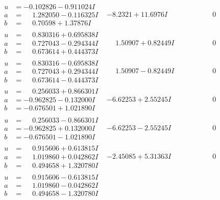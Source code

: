 \documentclass[1p]{elsarticle_modified}
\theoremstyle{definition}
\begin{document}
$$\begin{array}{c|c|c}
\begin{aligned}
u &= -0.102826 - 0.911024 I \\
a &= \phantom{-}1.282050 - 0.116325 I \\
b &= \phantom{-}0.70598 + 1.37876 I\end{aligned}
 & -8.2321 + 11.6976 I & \phantom{-0.000000 } 0 \\ \hline\begin{aligned}
u &= \phantom{-}0.830316 + 0.695838 I \\
a &= \phantom{-}0.727043 - 0.294344 I \\
b &= \phantom{-}0.673614 + 0.444373 I\end{aligned}
 & \phantom{-}1.50907 + 0.82449 I & \phantom{-0.000000 } 0 \\ \hline\begin{aligned}
u &= \phantom{-}0.830316 - 0.695838 I \\
a &= \phantom{-}0.727043 + 0.294344 I \\
b &= \phantom{-}0.673614 - 0.444373 I\end{aligned}
 & \phantom{-}1.50907 - 0.82449 I & \phantom{-0.000000 } 0 \\ \hline\begin{aligned}
u &= \phantom{-}0.256033 + 0.866301 I \\
a &= -0.962825 - 0.132000 I \\
b &= -0.676501 + 1.021890 I\end{aligned}
 & -6.62253 + 2.55245 I & \phantom{-0.000000 } 0 \\ \hline\begin{aligned}
u &= \phantom{-}0.256033 - 0.866301 I \\
a &= -0.962825 + 0.132000 I \\
b &= -0.676501 - 1.021890 I\end{aligned}
 & -6.62253 - 2.55245 I & \phantom{-0.000000 } 0 \\ \hline\begin{aligned}
u &= \phantom{-}0.915606 + 0.613815 I \\
a &= \phantom{-}1.019860 + 0.042862 I \\
b &= \phantom{-}0.494658 + 1.320780 I\end{aligned}
 & -2.45085 + 5.31363 I & \phantom{-0.000000 } 0 \\ \hline\begin{aligned}
u &= \phantom{-}0.915606 - 0.613815 I \\
a &= \phantom{-}1.019860 - 0.042862 I \\
b &= \phantom{-}0.494658 - 1.320780 I\end{aligned}

\end{array}$$
\end{document}
